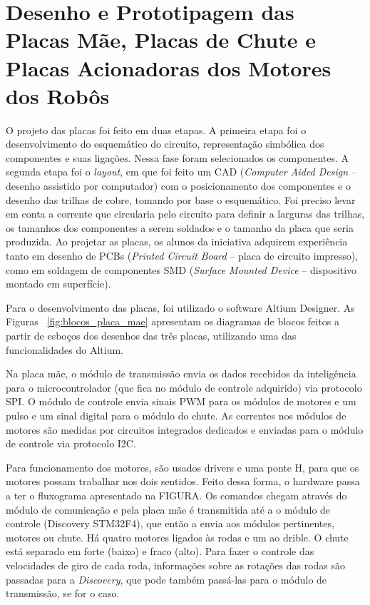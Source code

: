 \chapter{Desenho e Prototipagem das Placas Mãe, Placas de Chute e Placas Acionadoras dos Motores dos Robôs}\label{cap:design_placas}

O projeto das placas foi feito em duas etapas. A primeira etapa foi o desenvolvimento do esquemático do circuito, representação simbólica dos componentes e suas ligações. Nessa fase foram selecionados os componentes. A segunda etapa foi o \textit{layout}, em que foi feito um CAD (\textit{Computer Aided Design} ­– desenho assistido por computador) com o posicionamento dos componentes e o desenho das trilhas de cobre, tomando por base o esquemático. Foi preciso levar em conta a corrente que circularia pelo circuito para definir a larguras das trilhas, os tamanhos dos componentes a serem soldados e o tamanho da placa que seria produzida. Ao projetar as placas, os alunos da iniciativa adquirem experiência tanto em desenho de PCBs (\textit{Printed Circuit Board} – placa de circuito impresso), como em soldagem de componentes SMD (\textit{Surface Mounted Device} – dispositivo montado em superfície).

Para o desenvolvimento das placas, foi utilizado o software Altium Designer. As Figuras ~\ref{fig:blocos_placa_mae} apresentam os diagramas de blocos feitos a partir de esboços dos desenhos das três placas, utilizando uma das funcionalidades do Altium.

Na placa mãe, o módulo de transmissão envia os dados recebidos da inteligência para o microcontrolador (que fica no módulo de controle adquirido) via protocolo SPI.
O módulo de controle envia sinais PWM para os módulos de motores e um pulso e um sinal digital para o módulo do chute. As correntes nos módulos de motores são medidas por circuitos integrados dedicados e enviadas para o módulo de controle via protocolo I2C.

Para funcionamento dos motores, são usados drivers e uma ponte H, para que os motores possam trabalhar nos dois sentidos.
Feito dessa forma, o hardware passa a ter o fluxograma apresentado na FIGURA. Os comandos chegam através do módulo de comunicação e pela placa mãe é transmitida até a o módulo de controle (Discovery STM32F4), que então a envia aos módulos pertinentes, motores ou chute. Há quatro motores ligados às rodas e um ao drible. O chute está separado em forte (baixo) e fraco (alto). Para fazer o controle das velocidades de giro de cada roda, informações sobre as rotações das rodas são passadas para a \textit{Discovery}, que pode também passá-las para o módulo de transmissão, se for o caso.

